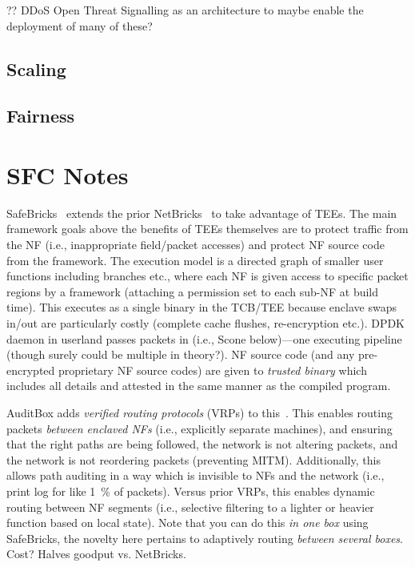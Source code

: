 ?? DDoS Open Threat Signalling \cite{ietf-dots-use-cases-17} as an architecture to maybe enable the deployment of many of these?

\subsection{Scaling}

\subsection{Fairness}

\section{SFC Notes}
SafeBricks~\parencite{DBLP:conf/nsdi/PoddarLPR18} extends the prior NetBricks~\parencite{DBLP:conf/osdi/PandaHJWRS16} to take advantage of TEEs.
The main framework goals above the benefits of TEEs themselves are to protect traffic from the NF (i.e., inappropriate field/packet accesses) and protect NF source code from the framework.
The execution model is a directed graph of smaller user functions including branches etc., where each NF is given access to specific packet regions by a framework (attaching a permission set to each sub-NF at build time).
This executes as a single binary in the TCB/TEE because enclave swaps in/out are particularly costly (complete cache flushes, re-encryption etc.).
DPDK daemon in userland passes packets in (i.e., Scone below)---one executing pipeline (though surely could be multiple in theory?).
NF source code (and any pre-encrypted proprietary NF source codes) are given to \emph{trusted binary} which includes all details and attested in the same manner as the compiled program.

AuditBox adds \emph{verified routing protocols} (VRPs) to this~\parencite{DBLP:conf/nsdi/LiuSKPSS21}.
This enables routing packets \emph{between enclaved NFs} (i.e., explicitly separate machines), and ensuring that the right paths are being followed, the network is not altering packets, and the network is not reordering packets (preventing MITM).
Additionally, this allows path auditing in a way which is invisible to NFs and the network (i.e., print log for like \qty{1}{\percent} of packets).
Versus prior VRPs, this enables dynamic routing between NF segments (i.e., selective filtering to a lighter or heavier function based on local state).
Note that you can do this \emph{in one box} using SafeBricks, the novelty here pertains to adaptively routing \emph{between several boxes}.
Cost? Halves goodput vs. NetBricks.

